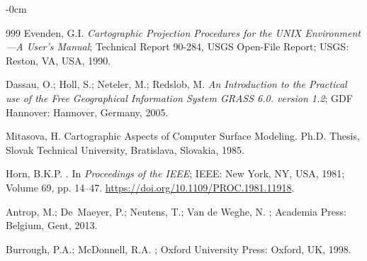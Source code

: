 \documentclass[technologies,article,accept,pdftex,moreauthors]{Definitions/mdpi}
\begin{document}
\begin{adjustwidth}{-\extralength}{0cm}
\begin{thebibliography}{999}
	Evenden, G.I.
	\newblock \emph{Cartographic Projection Procedures for the UNIX Environment---A
		User's Manual};
	\newblock Technical Report 90-284, USGS Open-File Report; USGS: Reston, VA, USA, 1990.
	
	
	Dassau, O.; Holl, S.; Neteler, M.; Redslob, M.
	\newblock \emph{An Introduction to the Practical use of the Free Geographical
		Information System GRASS 6.0. version 1.2}; GDF Hannover: Hannover, Germany, 2005. %
	
	Mitasova, H.
	\newblock Cartographic Aspects of Computer Surface Modeling.
	\newblock Ph.D. Thesis, Slovak Technical University, Bratislava, Slovakia,  1985.
	
	
	Horn, B.K.P.
	.
	\newblock In \emph{Proceedings of the IEEE}; IEEE: New York, NY, USA, 1981; Volume 69, pp. 14--47. %
	{\url{https://doi.org/10.1109/PROC.1981.11918}}.
	
	Antrop, M.; De~Maeyer, P.; Neutens, T.; {Van de Weghe}, N.
	; Academia Press: Belgium, Gent,
	2013.
	
	
	Burrough, P.A.; McDonnell, R.A.
	; Oxford
	University Press: Oxford, UK,  1998.
	
\end{thebibliography}
\PublishersNote{}
%

\end{adjustwidth}
\end{document}

